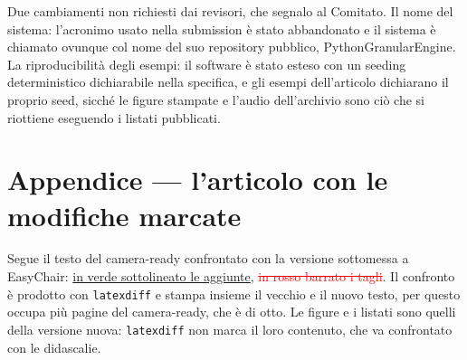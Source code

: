 \documentclass[11pt,a4paper]{article}
\begin{document}
Due cambiamenti non richiesti dai revisori, che segnalo al Comitato. Il
nome del sistema: l'acronimo usato nella submission è stato abbandonato e il
sistema è chiamato ovunque col nome del suo repository pubblico,
PythonGranularEngine. La riproducibilità degli esempi: il software è stato
esteso con un seeding deterministico dichiarabile nella specifica, e gli
esempi dell'articolo dichiarano il proprio seed, sicché le figure stampate e
l'audio dell'archivio sono ciò che si riottiene eseguendo i listati
pubblicati.

\clearpage
\section*{Appendice --- l'articolo con le modifiche marcate}

Segue il testo del camera-ready confrontato con la versione sottomessa a
EasyChair: \textcolor[rgb]{0,0.55,0}{\uline{in verde sottolineato le
aggiunte}}, \textcolor{red}{\sout{in rosso barrato i tagli}}. Il confronto
è prodotto con \texttt{latexdiff} e stampa insieme il vecchio e il nuovo
testo, per questo occupa più pagine del camera-ready, che è di otto. Le
figure e i listati sono quelli della versione nuova: \texttt{latexdiff} non
marca il loro contenuto, che va confrontato con le didascalie.


\end{document}
